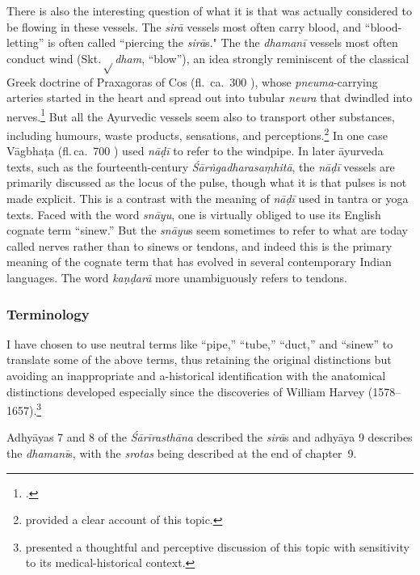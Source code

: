 \begin{refsection}
\label{intro:tubes} There is also the interesting question of what it
is that was actually considered to be flowing in these vessels.  The
\emph{sirā} vessels most often carry blood, and “blood-letting” is
often called “piercing the \emph{sirā}s."  The the \emph{dhamanī}
vessels most often conduct wind (Skt.\,{\small$\sqrt{}$}\emph{dham},
“blow”), an idea strongly reminiscent of the classical Greek doctrine
of Praxagoras of Cos (fl.\ ca.\ 300 \BCE), whose
\emph{pneuma}-carrying arteries started in the heart and spread out
into tubular \emph{neura} that dwindled into
nerves.\footnote{\cites[17--19,
    49--53]{stec-1958}[137]{phil-1973}[137--159 et passim]{wals-2016}.}
    But all the Ayurvedic vessels seem also to transport other substances,
    including humours, waste products, sensations, and
    perceptions.\footnote{\citet[344--52]{dasg-hist} provided a clear
        account of this topic.} In one case Vāgbhaṭa (fl.\,ca.\ 700 \CE) used
        \emph{nāḍī} to refer to the windpipe. In later āyurveda texts, such as
        the fourteenth-century \emph{Śārṅgadharasaṃhitā}, the \emph{nāḍī}
        vessels are primarily discussed as the locus of the pulse, though what
        it is that pulses is not made explicit. This is a contrast with the
        meaning of \emph{nāḍī} used in tantra or yoga texts.  Faced with the
        word \emph{snāyu}, one is virtually obliged to use its English cognate
        term “sinew.”  But the \emph{snāyu}s seem sometimes to refer to what
        are today called nerves rather than to sinews or tendons, and indeed
        this is the primary meaning of the cognate term that has evolved in
        several contemporary Indian languages. The word \emph{kaṇḍarā} more
        unambiguously refers to tendons.

\subsubsection{Terminology}

I have chosen to use neutral terms like “pipe,” “tube,” “duct,” and
“sinew” to translate some of the above terms, thus retaining the
original distinctions but avoiding an inappropriate and a-historical
identification with the anatomical distinctions developed especially
since the discoveries of William Harvey 
(1578--1657).\footnote{\citet[27--29]{kutu-1962} presented a thoughtful and 
perceptive discussion of this topic with sensitivity to its medical-historical 
context.}

Adhyāyas 7 and 8 of the \emph{Śārīrasthāna} described the \emph{sirā}s
and adhyāya 9 describes the \emph{dhamanī}s, with the \emph{srotas} being
described at the end of chapter~9.


\end{refsection}
